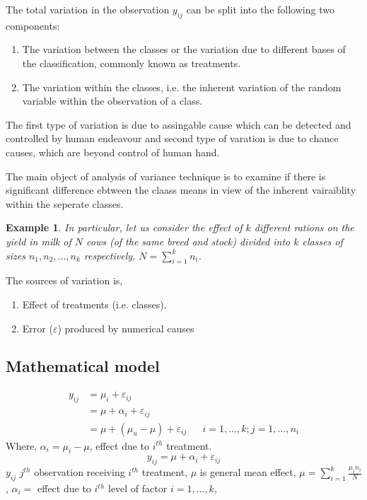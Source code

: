 \documentclass[oneside,11pt,pdftex]{book}%
\numberwithin{equation}{section}
\newtheorem{example}[theorem]{Example}
\numberwithin{section}{chapter}
\numberwithin{equation}{chapter}
\begin{document}
The total variation in the observation $ y_{ij} $ can be split into the following two components: 
\begin{enumerate}
	\item The variation between the classes or the variation due to different bases of the classification, commonly known as treatments.
	\item The variation within the classes, i.e. the inherent variation of the random variable within the observation of a class.
\end{enumerate}
The first type of variation is due to assingable cause which can be detected and controlled by human endeavour and second type of varation is due to chance causes, which are beyond control of human hand.
\par 
The main object of analysis of variance technique is to examine if there is significant difference ebtween the claass means in view of the inherent vairaiblity within the seperate classes.
\par 
\begin{example}
	In particular, let us consider the effect of $ k $ different rations on the yield in milk of $ N $ cows (of the same breed and stock) divided into $ k $ classes of sizes $ n_1, n_2, \dots, n_k $ respectively, $ N=\sum_{i=1}^{k} n_i$.
\end{example}

The sources of variation is,
\begin{enumerate}
	\item Effect of treatments (i.e. classes).
	\item Error ($ \varepsilon $) produced by numerical causes
\end{enumerate}

\subsection{Mathematical model}
\begin{align*}
	y_{ij}&=\mu_i + \varepsilon_{ij} && \\
	&= \mu + \alpha_i + \varepsilon_{ij}&&\\
	&= \mu + (\mu_u - \mu) + \varepsilon_{ij} && i=1,\dots,k; j=1,\dots,n_i
\end{align*}
Where, $ \alpha_i=\mu_i-\mu $, effect due to $ i^{th} $ treatment.
 \[  y_{ij}=\mu + \alpha_i +\varepsilon_{ij}\]
$ y_{ij} $ $ j^{th} $ observation receiving $i^{th}$ treatment, $ \mu $ is general mean effect, $ \mu=\sum_{i=1}^{k}\frac{\mu_i n_i}{N} $, $ \alpha_i =$ effect due to $ i^{th} $ level of factor $ i=1,\dots,k $, 
 
\end{document}
